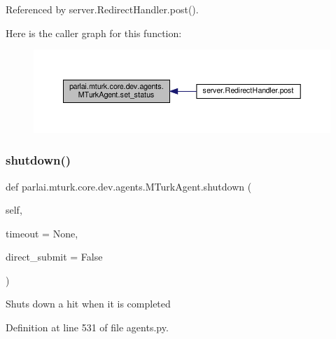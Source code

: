Referenced by server.\+Redirect\+Handler.\+post().

Here is the caller graph for this function\+:
\nopagebreak
\begin{figure}[H]
\begin{center}
\leavevmode
\includegraphics[width=350pt]{classparlai_1_1mturk_1_1core_1_1dev_1_1agents_1_1MTurkAgent_ade82426c779f110dc1b5f5b309e4a281_icgraph}
\end{center}
\end{figure}
\mbox{\label{classparlai_1_1mturk_1_1core_1_1dev_1_1agents_1_1MTurkAgent_a2b0576f33db15042a1520f6c9b4157c2}} 
\subsubsection{\texorpdfstring{shutdown()}{shutdown()}}
{\footnotesize\ttfamily def parlai.\+mturk.\+core.\+dev.\+agents.\+M\+Turk\+Agent.\+shutdown (\begin{DoxyParamCaption}\item[{}]{self,  }\item[{}]{timeout = {\ttfamily None},  }\item[{}]{direct\+\_\+submit = {\ttfamily False} }\end{DoxyParamCaption})}

\begin{DoxyVerb}Shuts down a hit when it is completed\end{DoxyVerb}
 

Definition at line 531 of file agents.\+py.



